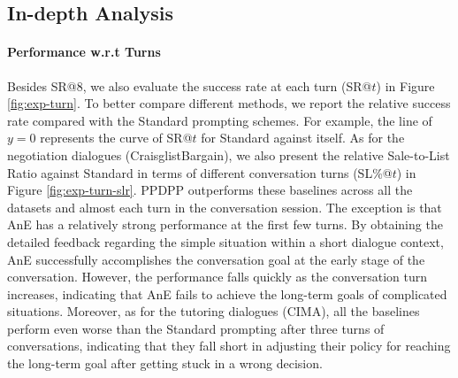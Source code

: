 \documentclass{article} %
\begin{document}
\subsection{In-depth Analysis}








\paragraph{Performance w.r.t Turns}
Besides SR@8, we also evaluate the  success rate at each turn (SR@$t$) in Figure \ref{fig:exp-turn}. To better compare different methods, we report the relative success rate compared with the Standard prompting schemes. For example, the line of $y = 0$ represents the curve of SR@$t$ for Standard against itself. 
As for the negotiation dialogues (CraisglistBargain), we also present the relative Sale-to-List Ratio against Standard in terms of different conversation turns (SL\%@$t$) in Figure \ref{fig:exp-turn-slr}.  
PPDPP outperforms these baselines across all the datasets and almost each turn in the conversation session. 
The exception is that AnE has a relatively strong performance at the first few turns. 
By obtaining the detailed feedback regarding the simple situation within a short dialogue context, AnE successfully accomplishes the conversation goal at the early stage of the conversation. However, the performance falls quickly as the conversation turn increases, indicating that AnE fails to achieve the long-term goals of complicated situations. 
Moreover, as for the tutoring dialogues (CIMA), all the baselines perform even worse than the Standard prompting after three turns of conversations, indicating that they fall short in adjusting their policy for reaching the long-term goal after getting stuck in a wrong decision. 


\vspace{-0.2cm}
\end{document}
